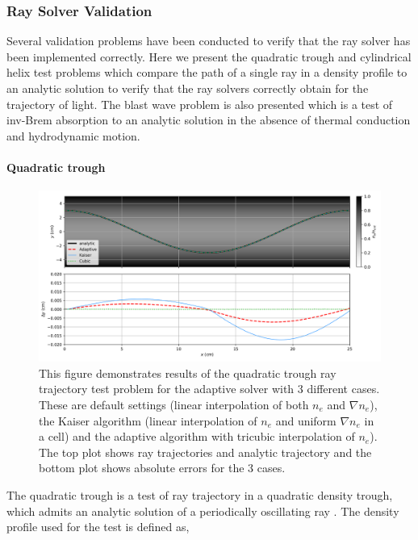 \subsubsection{Ray Solver Validation}
\label{sec:SOLAS_ray_validation}

Several validation problems have been conducted to verify that the ray solver has been implemented correctly.
Here we present the quadratic trough and cylindrical helix test problems which compare the path of a single ray in a density profile to an analytic solution to verify that the ray solvers correctly obtain for the trajectory of light.
The blast wave problem is also presented which is a test of \ac{inv-Brem} absorption to an analytic solution in the absence of thermal conduction and hydrodynamic motion.

\paragraph*{Quadratic trough}

\begin{figure}[t!]
    \includegraphics[width=\linewidth]{Numerics/Images/Quadtrough.png}
    \centering
    \caption{This figure demonstrates results of the quadratic trough ray trajectory test problem for the adaptive solver with 3 different cases.
    These are default settings (linear interpolation of both $n_e$ and $\nabla n_e$), the Kaiser algorithm (linear interpolation of $n_e$ and uniform $\nabla n_e$ in a cell) and the adaptive algorithm with tricubic interpolation of $n_e$).
    The top plot shows ray trajectories and analytic trajectory and the bottom plot shows absolute errors for the 3 cases.}
    \label{fig:SOLAS_quadtrough}
\end{figure}

The quadratic trough is a test of ray trajectory in a quadratic density trough, which admits an analytic solution of a periodically oscillating ray \cite{kaiser_laser_2000,haines_coupling_2020}.
The density profile used for the test is defined as,

